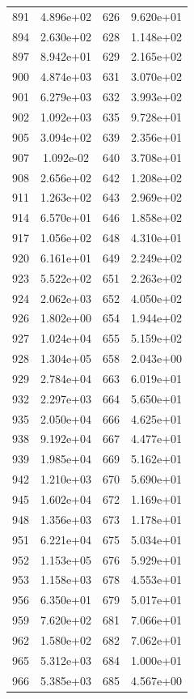 \documentclass[12pt]{article}
\begin{document}
\begin{longtable}{@{}cccc@{}}
891 & 4.896e+02 & 626 & 9.620e+01 \\
894 & 2.630e+02 & 628 & 1.148e+02 \\
897 & 8.942e+01 & 629 & 2.165e+02 \\
900 & 4.874e+03 & 631 & 3.070e+02 \\
901 & 6.279e+03 & 632 & 3.993e+02 \\
902 & 1.092e+03 & 635 & 9.728e+01 \\
905 & 3.094e+02 & 639 & 2.356e+01 \\
907 & 1.092e-02 & 640 & 3.708e+01 \\
908 & 2.656e+02 & 642 & 1.208e+02 \\
911 & 1.263e+02 & 643 & 2.969e+02 \\
914 & 6.570e+01 & 646 & 1.858e+02 \\
917 & 1.056e+02 & 648 & 4.310e+01 \\
920 & 6.161e+01 & 649 & 2.249e+02 \\
923 & 5.522e+02 & 651 & 2.263e+02 \\
924 & 2.062e+03 & 652 & 4.050e+02 \\
926 & 1.802e+00 & 654 & 1.944e+02 \\
927 & 1.024e+04 & 655 & 5.159e+02 \\
928 & 1.304e+05 & 658 & 2.043e+00 \\
929 & 2.784e+04 & 663 & 6.019e+01 \\
932 & 2.297e+03 & 664 & 5.650e+01 \\
935 & 2.050e+04 & 666 & 4.625e+01 \\
938 & 9.192e+04 & 667 & 4.477e+01 \\
939 & 1.985e+04 & 669 & 5.162e+01 \\
942 & 1.210e+03 & 670 & 5.690e+01 \\
945 & 1.602e+04 & 672 & 1.169e+01 \\
948 & 1.356e+03 & 673 & 1.178e+01 \\
951 & 6.221e+04 & 675 & 5.034e+01 \\
952 & 1.153e+05 & 676 & 5.929e+01 \\
953 & 1.158e+03 & 678 & 4.553e+01 \\
956 & 6.350e+01 & 679 & 5.017e+01 \\
959 & 7.620e+02 & 681 & 7.066e+01 \\
962 & 1.580e+02 & 682 & 7.062e+01 \\
965 & 5.312e+03 & 684 & 1.000e+01 \\
966 & 5.385e+03 & 685 & 4.567e+00 \\

\end{longtable}
\end{document}
